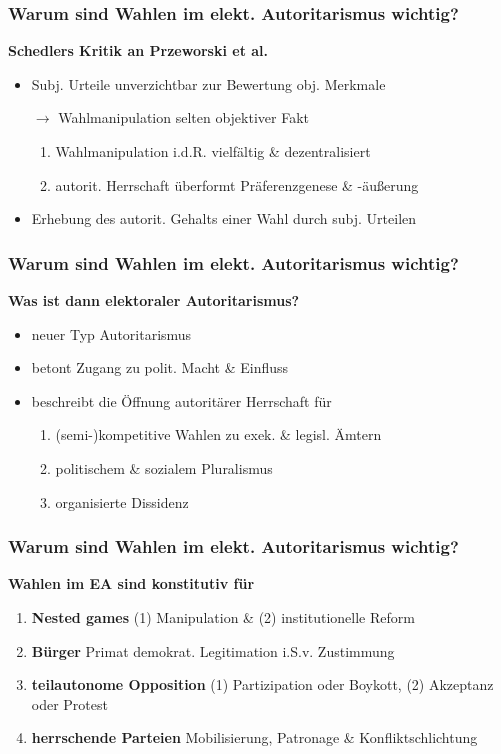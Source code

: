 \documentclass{beamer}\usepackage[]{graphicx}\usepackage[]{color}
\begin{document}
\begin{frame}
  \frametitle{Warum sind Wahlen im elekt. Autoritarismus wichtig?}
  \textbf{Schedlers Kritik an Przeworski et al.}
  \begin{itemize}
    \item Subj. Urteile unverzichtbar zur Bewertung obj. Merkmale
    \item[$\rightarrow$] Wahlmanipulation selten objektiver Fakt
    \begin{enumerate}
      \item Wahlmanipulation i.d.R. vielfältig \& dezentralisiert
      \item autorit. Herrschaft überformt Präferenzgenese \& -äußerung
    \end{enumerate}
    \item Erhebung des autorit. Gehalts einer Wahl durch subj. Urteilen
  \end{itemize}
\end{frame}

\begin{frame}
  \frametitle{Warum sind Wahlen im elekt. Autoritarismus wichtig?}
  \textbf{Was ist dann elektoraler Autoritarismus?}
  \begin{itemize}
    \item neuer Typ Autoritarismus
    \item betont Zugang zu polit. Macht \& Einfluss
    \item beschreibt die Öffnung autoritärer Herrschaft für
    \begin{enumerate}
      \item (semi-)kompetitive Wahlen zu exek. \& legisl. Ämtern
      \item politischem \& sozialem Pluralismus
      \item organisierte Dissidenz
    \end{enumerate}
  \end{itemize}
\end{frame}

\begin{frame}
  \frametitle{Warum sind Wahlen im elekt. Autoritarismus wichtig?}
  \textbf{Wahlen im EA sind konstitutiv für}
  \begin{enumerate}
    \item \textbf{Nested games} (1) Manipulation \& (2) institutionelle Reform
    \item \textbf{Bürger} Primat demokrat. Legitimation i.S.v. Zustimmung
    \item \textbf{teilautonome Opposition} (1) Partizipation oder Boykott, (2) Akzeptanz oder Protest
    \item \textbf{herrschende Parteien} Mobilisierung, Patronage \& Konfliktschlichtung
  \end{enumerate}
\end{frame}
\end{document}
